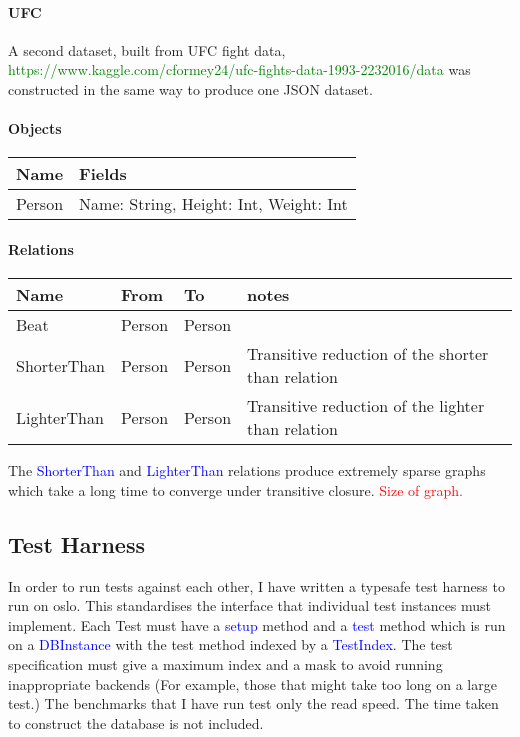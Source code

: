 \documentclass[12pt,a4paper,twoside,openright]{report}
\newcommand\todo[1]{\textcolor{red}{#1}}
\newcommand\codeName[1]{\textcolor{blue}{#1}}
\newcommand\toReference[1]{\textcolor{green}{#1}}
\begin{document}
{{		\paragraph{UFC}
		
		A second dataset, built from UFC fight data, \toReference{https://www.kaggle.com/cformey24/ufc-fights-data-1993-2232016/data} was constructed in the same way to produce one JSON dataset.
		
		\paragraph{Objects}
\begin{center}
	\begin{tabular}{ |p{3cm}| p{9cm}|}
	\hline
		Name & Fields \\ \hline
		Person & Name: String, Height: Int, Weight: Int\\ \hline
	\end{tabular}
\end{center}

\paragraph{Relations}
\begin{center}
	\begin{tabular}{ |p{3cm}|| p{2cm}| p{2cm}||p{3cm}|}
	\hline
		Name &  From & To & notes \\ \hline
		Beat & Person & Person & \\ \hline
		ShorterThan &  Person & Person & Transitive reduction of the shorter than relation \\ \hline
		LighterThan & Person & Person & Transitive reduction of the lighter than relation \\ \hline

	\end{tabular}
\end{center}
		
		The \codeName{ShorterThan} and \codeName{LighterThan} relations produce extremely sparse graphs which take a long time to converge under transitive closure. \todo{Size of graph.}
	\subsection{Test Harness}
	In order to run tests against each other, I have written a typesafe test harness to run on oslo. This standardises the interface that individual test instances must implement. Each Test must have a \codeName{setup} method and a \codeName{test} method which is run on a \codeName{DBInstance} with the test method indexed by a \codeName{TestIndex}. The test specification must give a maximum index and a mask to avoid running inappropriate backends (For example, those that might take too long on a large test.) The benchmarks that I have run test only the read speed. The time taken to construct the database is not included.
	
}}
\end{document}
